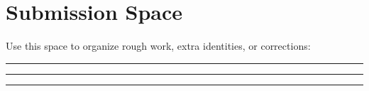\documentclass[hidelinks]{article}
\begin{document}
\section{Submission Space}
Use this space to organize rough work, extra identities, or corrections:

\vspace{1cm}
\noindent\rule{\textwidth}{0.4pt}

\vspace{2cm}
\noindent\rule{\textwidth}{0.4pt}

\vspace{2cm}
\noindent\rule{\textwidth}{0.4pt}
\end{document}
